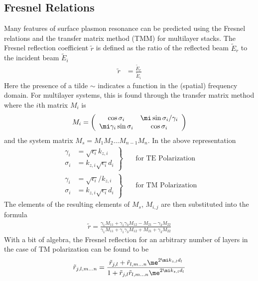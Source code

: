 \subsection{Fresnel Relations}
Many features of surface plasmon resonance can be predicted using the
Fresnel relations and the transfer matrix method (TMM) for multilayer
stacks.
The Fresnel reflection coefficient $\tilde{r}$ is defined as the ratio of the
reflected beam $\tilde{E}_r$ to the incident beam
$\tilde{E}_i$
\begin{align}
\tilde{r} &= \frac{\tilde{E}_r}{\tilde{E}_i}
\end{align}
Here the presence of a tilde $\sim$ indicates a function in the (spatial)
frequency domain.  For multilayer systems, this is found through
the transfer matrix method where the $i$th matrix $M_i$ is
\begin{align}
M_i = \left(\begin{array}{cc}
\cos \sigma_i & \mi \sin \sigma_i / \gamma_i\\
\mi \gamma_i \sin \sigma_i & \cos \sigma_i
\end{array}\right)
\label{eqn:tmm}
\end{align}
and the system matrix $M_s = M_1 M_2 \ldots M_{n-1} M_n$.  In the above
representation
\begin{align}
\left.\begin{aligned}
\gamma_i &= \sqrt{\epsilon_i} k_{z,i}\\
\sigma_i &= k_{z,i} \sqrt{\epsilon_i} d_i
\end{aligned}
\right\}& \quad \text{for TE Polarization}\\
\left.\begin{aligned}
\gamma_i &= \sqrt{\epsilon_i}/k_{z,i}\\
\sigma_i &= k_{z,i} \sqrt{\epsilon_i} d_i
\end{aligned}
\right\}& \quad \text{for TM Polarization}
\end{align}
The elements of the resulting elements of $M_s$, $M_{i,j}$ are then
substituted into the formula
\begin{align}
\tilde{r}=
\frac{\gamma_1 M_{11}+\gamma_1 \gamma_3 M_{12} - M_{21} - \gamma_3 M_{22}}
{\gamma_1 M_{11}+\gamma_1 \gamma_3 M_{12} + M_{21} + \gamma_3 M_{22}}
\end{align}
With a bit of algebra, the Fresnel reflection for an arbitrary number of
layers in the case of TM polarization can be found to be
\begin{align}
\tilde{r}_{j,l,m \ldots n} = 
\frac{\tilde{r}_{j,l} + \tilde{r}_{l,m \ldots n} \me^{2 \mi k_{z,l} d_l}}
{1+\tilde{r}_{j,l} \tilde{r}_{l,m \ldots n} \me^{2 \mi k_{z,l} d_l}}
\label{eqn:bertnlayer}
\end{align}
